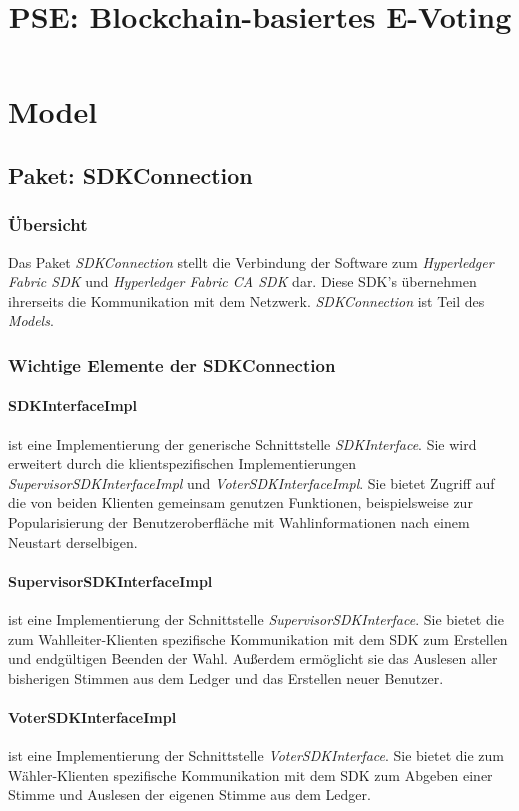 \documentclass[parskip=full]{scrartcl}
\title{PSE: Blockchain-basiertes E-Voting}
\begin{document}
	\clearpage
	\maketitle
	\newpage
	
	\tableofcontents
	\newpage
	
	\newpage
	\section{Model}
	\subsection{Paket: SDKConnection}
	\subsubsection{Übersicht}
	Das Paket \textit{SDKConnection} stellt die Verbindung der Software zum \textit{Hyperledger Fabric SDK} und \textit{Hyperledger Fabric CA SDK} dar. Diese SDK's übernehmen ihrerseits die Kommunikation mit dem Netzwerk. \textit{SDKConnection} ist Teil des \textit{Models}.
	\subsubsection{Wichtige Elemente der SDKConnection}
	\paragraph{SDKInterfaceImpl} ist eine Implementierung der generische Schnittstelle \textit{SDKInterface}. Sie wird erweitert durch die klientspezifischen Implementierungen \textit{SupervisorSDKInterfaceImpl} und \textit{VoterSDKInterfaceImpl}. Sie bietet Zugriff auf die von beiden Klienten gemeinsam genutzen Funktionen, beispielsweise zur Popularisierung der Benutzeroberfläche mit Wahlinformationen nach einem Neustart derselbigen.
	\paragraph{SupervisorSDKInterfaceImpl} ist eine Implementierung der Schnittstelle \textit{SupervisorSDKInterface}. Sie bietet die zum Wahlleiter-Klienten spezifische Kommunikation mit dem SDK zum Erstellen und endgültigen Beenden der Wahl. Außerdem ermöglicht sie das Auslesen aller bisherigen Stimmen aus dem Ledger und das Erstellen neuer Benutzer.
	\paragraph{VoterSDKInterfaceImpl} ist eine Implementierung der Schnittstelle \textit{VoterSDKInterface}. Sie bietet die zum Wähler-Klienten spezifische Kommunikation mit dem SDK zum Abgeben einer Stimme und Auslesen der eigenen Stimme aus dem Ledger.
\end{document}
